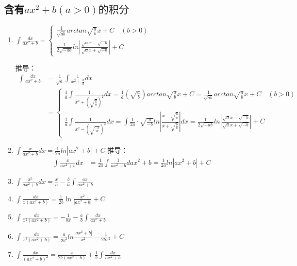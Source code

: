 \subsection{含有$ax^2+b (a>0)的积分$}
\begin{enumerate}
	\item $\int \frac{dx}{ax^2+b}=\begin{cases}
	\frac{1}{\sqrt{ab}}arctan\sqrt{\frac{a}{b}}x+C \quad (b>0)\\ 
	\frac{1}{2\sqrt{-ab}}ln|\frac{\sqrt{a}x-\sqrt{-b}}{\sqrt{a}x+\sqrt{-b}}|+C
	\end{cases}$

	推导：
	\begin{align}
			\int \frac{dx}{ax^2+b}&=\frac{1}{\sqrt{a}}\int\frac{1}{x^2+\frac{b}{a}}dx\\ 
			&=
				\begin{cases}
					\frac{1}{a}\int\frac{1}{x^2+\left(\sqrt{\frac{b}{a}}\right)^2}dx = \frac{1}{a}\left(\sqrt{\frac{a}{b}}\right)arctan\sqrt{\frac{a}{b}}x+C=\frac{1}{\sqrt{ab}}arctan\sqrt{\frac{a}{b}}x+C \quad (b>0)\\ 
					\frac{1}{a}\int \frac{1}{x^2-\left(\sqrt{\frac{-b}{a}}\right)^2}dx = \int \frac{1}{2a}\cdot\sqrt{\frac{a}{-b}}ln|\frac{x-\sqrt{\frac{b}{a}}}{x+\sqrt{\frac{b}{a}}}|dx=\frac{1}{2\sqrt{-ab}}ln|\frac{\sqrt{a}x-\sqrt{-b}}{\sqrt{a}x+\sqrt{-b}}|+C
				\end{cases}
	\end{align}
	\item $\int \frac{x}{ax^2+b}dx=\frac{1}{2a}ln|ax^2+b|+C$
	推导：
	\begin{equation}
		\begin{split}
			\int \frac{x}{ax^2+b}dx&=\frac{1}{2a}\int\frac{1}{ax^2+b}d{ax^2+b}=\frac{1}{2a}ln|ax^2+b|+C
		\end{split}
	\end{equation}
	\item $\int\frac{x^2}{ax^2+b}dx=\frac{x}{a}-\frac{b}{a}\int\frac{ax}{ax^2+b}$
	\item $\int\frac{dx}{x(ax^2+b)}=\frac{1}{2b}\ln\frac{x^2}{|ax^2+b|}+C$
	\item $\int\frac{dx}{x^2(ax^2+b)}=-\frac{1}{bx}-\frac{a}{b}\int\frac{dx}{ax^2+b}$
	\item $\int\frac{dx}{x^3(ax^2+b)}=\frac{a}{2b^2}ln\frac{|ax^2+b|}{x^2}-\frac{1}{2bx^2}+C$
	\item $\int\frac{dx}{(ax^2+b)^2}=\frac{x}{2b(ax^2+b)}+\frac{1}{b}\int\frac{dx}{ax^2+b}$
\end{enumerate}
